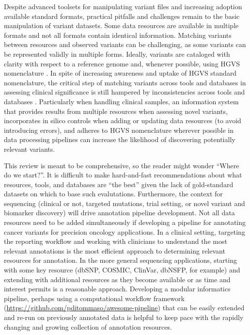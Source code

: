\documentclass{article}
\begin{document}
Despite advanced toolsets for manipulating variant files and
increasing adoption available standard formats, practical pitfalls and
challenges remain to the basic manipulation of variant datasets. Some
data resources are available in multiple formats and not all formats
contain identical information. Matching variants between resources and
observed variants can be challenging, as some variants can be
represented validly in multiple forms. Ideally, variants are cataloged
with clarity with respect to a reference genome and, whenever
possible, using HGVS nomenclature \parencite{Den_Dunnen2016-gw}. In spite
of increasing awareness and uptake of HGVS standard nomenclature, the
critical step of matching variants across tools and databases in
assessing clinical significance is still hampered by inconsistencies
across tools and databases \parencite{Yen2017-lq}. Particularly when
handling clinical samples, an information system that provides results
from multiple resources when assessing novel variants, incorporates in
silico controls when adding or updating data resources (to avoid
introducing errors), and adheres to HGVS nomenclature wherever
possible in data processing pipelines can increase the likelihood of
discovering potentially relevant variants.

This review is meant to be comprehensive, so the reader might wonder
``Where do we start?''. It is difficult to make hard-and-fast
recommendations about what resources, tools, and databases are ``the
best'' given the lack of gold-standard datasets on which to base such
evalutations. Furthermore, the context for sequencing (clinical or
not, targeted mutations, trial setting, or novel variant and biomarker
discovery) will drive annotation pipeline development. Not all data resources need
to be added simultaneously if developing a pipeline for annotating
cancer variants for precision oncology applications. In a clinical
setting, targeting the reporting workflow and working with clinicians
to understand the most relevant annotations is the most efficient
approach to determining relevant resources for annotation. In the more
general sequencing applications, starting with some key resource
(dbSNP, COSMIC, ClinVar, dbNSFP, for example) and
extending with additional resources as they become available or as
time and interest permits is a reasonable approach. Developing a modular
informatics pipeline, perhaps using a computational workflow framework
(\url{https://github.com/pditommaso/awesome-pipeline}) that can be easily
extended and re-run on previously annotated data is helpful to keep
pace with the rapidly changing and growing collection of annotation
resources. 
\end{document}

